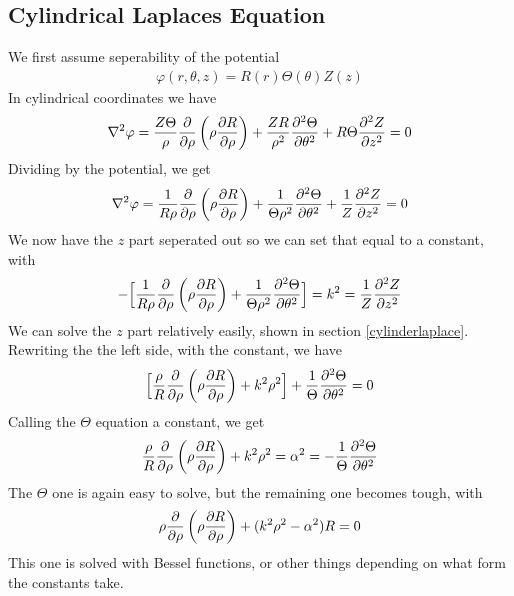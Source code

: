 \subsection{Cylindrical Laplaces Equation}\label{cylinderlaplacian}
We first assume seperability of the potential
\begin{align}
\varphi(r,\theta,z) = R(r)\Theta(\theta)Z(z)
\end{align}
In cylindrical coordinates we have
\begin{align}
\nabla^2 \varphi = {Z\Theta \over \rho}{\partial \over \partial \rho}\left(\rho {\partial R \over \partial \rho}\right)
+ {ZR \over \rho^2}{\partial^2 \Theta \over \partial \theta^2}
+ R\Theta {\partial^2 Z\over \partial z^2}= 0
\end{align}
Dividing by the potential, we get
\begin{align}
\nabla^2 \varphi = {1 \over R\rho}{\partial \over \partial \rho}\left(\rho {\partial R \over \partial \rho}\right)
+ {1 \over \Theta\rho^2}{\partial^2 \Theta \over \partial \theta^2}
+ \frac{1}{Z} {\partial^2 Z\over \partial z^2}= 0
\end{align}
We now have the $z$ part seperated out so we can set that equal to a constant, with
\begin{align}
- \Big[{1 \over R\rho}{\partial \over \partial \rho}\left(\rho {\partial R \over \partial \rho}\right)
+ {1 \over \Theta\rho^2}{\partial^2 \Theta \over \partial \theta^2}\Big]
= k^2 = \frac{1}{Z} {\partial^2 Z\over \partial z^2}
\end{align}
We can solve the $z$ part relatively easily, shown in section \ref{cylinderlaplace}. Rewriting the the left side, with the constant, we have
\begin{align}
 \Big[{\rho \over R}{\partial \over \partial \rho}\left(\rho {\partial R \over \partial \rho}\right)
 +k^2\rho^2\Big]
+ {1 \over \Theta}{\partial^2 \Theta \over \partial \theta^2} = 0
\end{align}
Calling the $\Theta$ equation a constant, we get
\begin{align}
{\rho \over R}{\partial \over \partial \rho}\left(\rho {\partial R \over \partial \rho}\right)
 +k^2\rho^2= \alpha^2 = -{1 \over \Theta}{\partial^2 \Theta \over \partial \theta^2}
\end{align}
The $\Theta$ one is again easy to solve, but the remaining one becomes tough, with
\begin{align}
{\rho }{\partial \over \partial \rho}\left(\rho {\partial R \over \partial \rho}\right)
 +(k^2\rho^2-\alpha^2)R = 0
\end{align}
This one is solved with Bessel functions, or other things depending on what form  the constants take.







